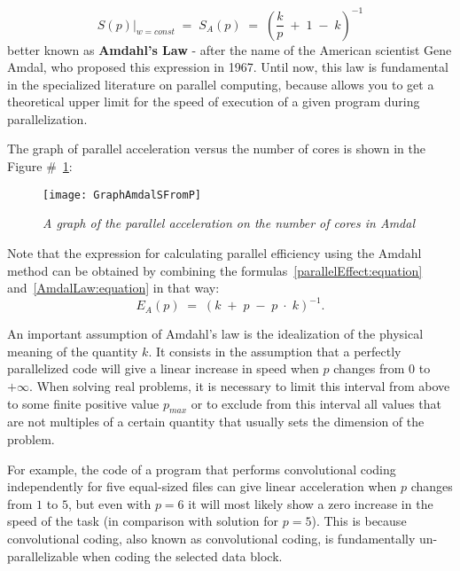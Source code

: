 {	\begin{equation}
		\label{AmdalLaw:equation}
		\left.S(p)\right|_{w=const}\;=\;S_A(p)\;=\;\left(\frac kp\;+\;1\;-\;k\right)^{-1}
	\end{equation}
	better known as \textbf{Amdahl’s Law} - after the name of the American scientist Gene Amdal, who proposed this expression in 1967. Until now, this law is fundamental in the specialized literature on parallel computing, because allows you to get a theoretical upper limit for the speed of execution of a given program during parallelization.
	\par The graph of parallel acceleration versus the number of cores is shown in the Figure \#~\ref{GraphAmdalSFromP:image}:
	\begin{figure}[H]
		\texttt{[image: GraphAmdalSFromP]}
		\caption{\textit{A graph of the parallel acceleration on the number of cores in Amdal}}
		\label{GraphAmdalSFromP:image}
	\end{figure}
	\par Note that the expression for calculating parallel efficiency using the Amdahl method can be obtained by combining the formulas~\eqref{parallelEffect:equation} and~\eqref{AmdalLaw:equation} in that way:
	\begin{equation}
		E_A(p)\;=\;\left(k\;+\;p\;-\;p\;\cdot\;k\right)^{-1}.
	\end{equation}
	\par An important assumption of Amdahl's law is the idealization of the physical meaning of the quantity $k$. It consists in the assumption that a perfectly parallelized code will give a linear increase in speed when $ p $ changes from $0$ to $+\infty$. When solving real problems, it is necessary to limit this interval from above to some finite positive value $p_{max}$ or to exclude from this interval all values that are not multiples of a certain quantity that usually sets the dimension of the problem.
	\par For example, the code of a program that performs convolutional coding independently for five equal-sized files can give linear acceleration when $p$ changes from $1$ to $5$, but even with $p = 6$ it will most likely show a zero increase in the speed of the task (in comparison with solution for $p = 5$). This is because convolutional coding, also known as convolutional coding, is fundamentally un-parallelizable when coding the selected data block.
	\par
}